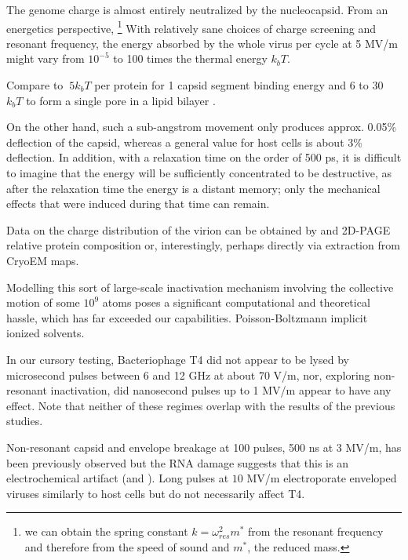 \documentclass[paper.tex]{subfiles}
\begin{document}
The genome charge is almost entirely neutralized by the nucleocapsid. From an energetics perspective, \footnote{we can obtain the spring constant $k = \omega_{res}^2 m^*$ from the resonant frequency and therefore from the speed of sound and $m^*$, the reduced mass.} With relatively sane choices of charge screening and resonant frequency, the energy absorbed by the whole virus per cycle at 5 MV/m might vary from $10^{-5}$ to 100 times the thermal energy $k_b T$.

Compare to $~5 k_b T$ per protein for 1 capsid segment binding energy \cite{Energies2012} \cite{Weak2002} and 6 to 30 $k_b T$ to form a single pore in a lipid bilayer \cite{Atomistic2014}.

On the other hand, such a sub-angstrom movement only produces approx. 0.05\% deflection of the capsid, whereas a general value for host cells is about 3\% deflection. In addition, with a relaxation time on the order of 500 ps, it is difficult to imagine that the energy will be sufficiently concentrated to be destructive, as after the relaxation time the energy is a distant memory; only the mechanical effects that were induced during that time can remain.

Data on the charge distribution of the virion can be obtained by and 2D-PAGE relative protein composition or, interestingly, perhaps directly via extraction from CryoEM maps.



Modelling this sort of large-scale inactivation mechanism involving the collective motion of some $10^9$ atoms poses a significant computational and theoretical hassle, which has far exceeded our capabilities. Poisson-Boltzmann implicit ionized solvents.


In our cursory testing, Bacteriophage T4 did not appear to be lysed by microsecond pulses between 6 and 12 GHz at about 70 V/m, nor, exploring non-resonant inactivation, did nanosecond pulses up to 1 MV/m appear to have any effect. Note that neither of these regimes overlap with the results of the previous studies.

 Non-resonant capsid and envelope breakage at 100 pulses, 500 ns at 3 MV/m, has been previously observed\cite{Inactivation1990} but the RNA damage suggests that this is an electrochemical artifact \cite{Formation1996} (and \cite{Microwave1987}). Long pulses at $10$ MV/m electroporate enveloped viruses similarly to host cells\cite{AC2017} but do not necessarily affect T4\cite{Manipulation2013}. 
\end{document}
